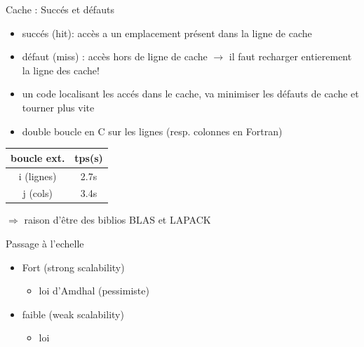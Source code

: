 \documentclass[11pt,mathserif]{beamer}
\begin{document}
\begin{frame}{Cache : Succés et défauts}
\begin{itemize}[<+->]
 \item succés (hit): accès a un emplacement présent dans la ligne de cache 
 \item défaut (miss) : accès hors de ligne de cache $\rightarrow$ il faut recharger entierement la ligne des cache!
 \item un code localisant les accés dans le cache, va minimiser les défauts de cache et tourner plus vite
 \item double boucle en C sur les lignes (resp. colonnes en Fortran)
\end{itemize}
\pause
\begin{minipage}[c]{0.49\linewidth}
  
\end{minipage}
\begin{minipage}[c]{0.49\linewidth}
    \begin{tabular}{|c|c|}
    \hline
     boucle ext. & tps(s)  \\
    \hline
      i (lignes) & 2.7s \\
      j (cols)  & 3.4s \\
    \hline
    \end{tabular}
\end{minipage}
\pause 
 $\Rightarrow$ raison d'être des biblios BLAS et LAPACK
\end{frame}
\begin{frame}{Passage à l'echelle}
\begin{itemize}[<+->]
  \item Fort (strong scalability)
    \begin{itemize} 
       \item loi d'Amdhal (pessimiste)
    \end{itemize}
  \item faible (weak scalability)
    \begin{itemize}
      \item loi
    \end{itemize}
\end{itemize}
\end{frame}
\end{document}
